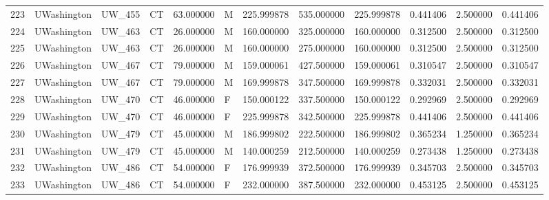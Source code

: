\begin{tabular}{llllrlrrrrrr}
223    &     UWashington &       UW\_455 &                 CT &  63.000000 &        M &       225.999878 &    535.000000 &  225.999878 &               0.441406 &            2.500000 &          0.441406 \\
224    &     UWashington &       UW\_463 &                 CT &  26.000000 &        M &       160.000000 &    325.000000 &  160.000000 &               0.312500 &            2.500000 &          0.312500 \\
225    &     UWashington &       UW\_463 &                 CT &  26.000000 &        M &       160.000000 &    275.000000 &  160.000000 &               0.312500 &            2.500000 &          0.312500 \\
226    &     UWashington &       UW\_467 &                 CT &  79.000000 &        M &       159.000061 &    427.500000 &  159.000061 &               0.310547 &            2.500000 &          0.310547 \\
227    &     UWashington &       UW\_467 &                 CT &  79.000000 &        M &       169.999878 &    347.500000 &  169.999878 &               0.332031 &            2.500000 &          0.332031 \\
228    &     UWashington &       UW\_470 &                 CT &  46.000000 &        F &       150.000122 &    337.500000 &  150.000122 &               0.292969 &            2.500000 &          0.292969 \\
229    &     UWashington &       UW\_470 &                 CT &  46.000000 &        F &       225.999878 &    342.500000 &  225.999878 &               0.441406 &            2.500000 &          0.441406 \\
230    &     UWashington &       UW\_479 &                 CT &  45.000000 &        M &       186.999802 &    222.500000 &  186.999802 &               0.365234 &            1.250000 &          0.365234 \\
231    &     UWashington &       UW\_479 &                 CT &  45.000000 &        M &       140.000259 &    212.500000 &  140.000259 &               0.273438 &            1.250000 &          0.273438 \\
232    &     UWashington &       UW\_486 &                 CT &  54.000000 &        F &       176.999939 &    372.500000 &  176.999939 &               0.345703 &            2.500000 &          0.345703 \\
233    &     UWashington &       UW\_486 &                 CT &  54.000000 &        F &       232.000000 &    387.500000 &  232.000000 &               0.453125 &            2.500000 &          0.453125 \\

\end{tabular}
